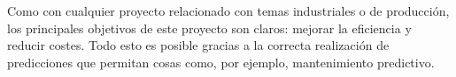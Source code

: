 
Como con cualquier proyecto relacionado con temas industriales o de producción, los principales objetivos
de este proyecto son claros: mejorar la eficiencia y reducir costes. Todo esto es posible gracias a la 
correcta realización de predicciones que permitan cosas como, por ejemplo, mantenimiento predictivo. 


